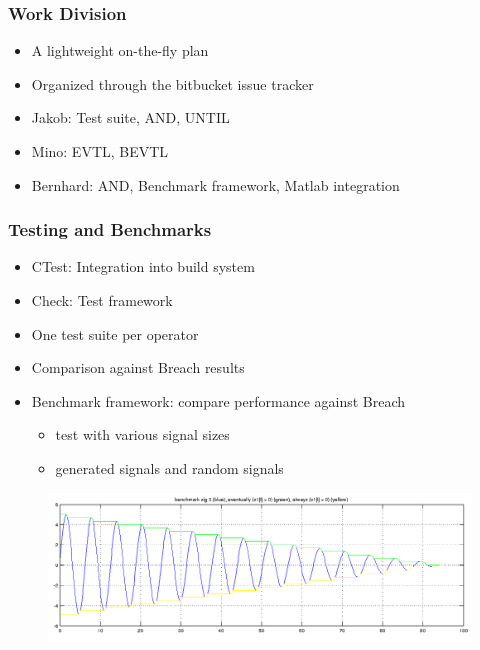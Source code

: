 \documentclass[notes=show]{beamer}
\begin{document}
\begin{frame}
\frametitle{Work Division}
\begin{itemize}
\item A lightweight on-the-fly plan
\item Organized through the bitbucket issue tracker
\item Jakob: Test suite, AND, UNTIL
\item Mino: EVTL, BEVTL
\item Bernhard: AND, Benchmark framework, Matlab integration
\end{itemize}
\end{frame}

\begin{frame}
\frametitle{Testing and Benchmarks}
\begin{itemize}
\item CTest: Integration into build system
\item Check: Test framework
\item One test suite per operator
\item Comparison against Breach results
\item Benchmark framework: compare performance against Breach
\begin{itemize}
	\item test with various signal sizes
	\item generated signals and random signals
\end{itemize}
\end{itemize}
\begin{figure}[H]
    \includegraphics[scale=0.3]{bm_sig3_ev_alw.png}
\end{figure}
\end{frame}
\end{document}
